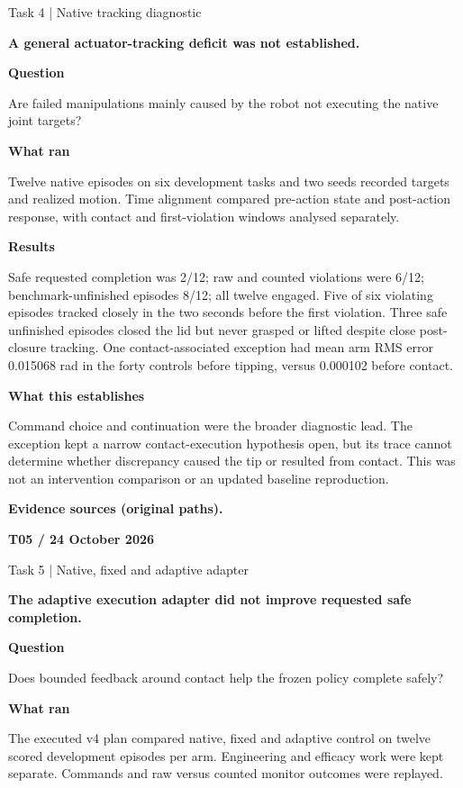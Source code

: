 \documentclass[11pt,a4paper]{article}
\newcommand{\block}[2]{\par\textbf{\color{ink}#1}\par\nopagebreak #2\par}
\newcommand{\finding}[1]{\begin{tcolorbox}[colback=pale,colframe=pale,boxrule=0pt,arc=1mm,left=10pt,right=10pt,top=10pt,bottom=10pt]\color{ink}\large\bfseries #1\end{tcolorbox}}
\begin{document}
\par
{\color{muted}\small Task 4 | Native tracking diagnostic}\par\vspace{2mm}
\finding{A general actuator-tracking deficit was not established.}
\block{Question}{Are failed manipulations mainly caused by the robot not executing the native joint targets?}
\block{What ran}{Twelve native episodes on six development tasks and two seeds recorded targets and realized motion. Time alignment compared pre-action state and post-action response, with contact and first-violation windows analysed separately.}
\block{Results}{Safe requested completion was 2/12; raw and counted violations were 6/12; benchmark-unfinished episodes 8/12; all twelve engaged. Five of six violating episodes tracked closely in the two seconds before the first violation. Three safe unfinished episodes closed the lid but never grasped or lifted despite close post-closure tracking. One contact-associated exception had mean arm RMS error 0.015068 rad in the forty controls before tipping, versus 0.000102 before contact.}
\block{What this establishes}{Command choice and continuation were the broader diagnostic lead. The exception kept a narrow contact-execution hypothesis open, but its trace cannot determine whether discrepancy caused the tip or resulted from contact. This was not an intervention comparison or an updated baseline reproduction.}
\vfill{\footnotesize\color{muted}\textbf{Evidence sources (original paths).}\par
\raggedright {}}
\clearpage
{}\label{exp:T05}
{\color{accent}\small\bfseries T05 / 24 October 2026}\par
{}\par
{\color{muted}\small Task 5 | Native, fixed and adaptive adapter}\par\vspace{2mm}
\finding{The adaptive execution adapter did not improve requested safe completion.}
\block{Question}{Does bounded feedback around contact help the frozen policy complete safely?}
\block{What ran}{The executed v4 plan compared native, fixed and adaptive control on twelve scored development episodes per arm. Engineering and efficacy work were kept separate. Commands and raw versus counted monitor outcomes were replayed.}
\end{document}
